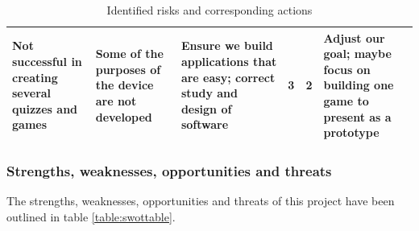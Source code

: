 \documentclass{article}
\begin{document}
\begin{table}[h]
\begin{center}
\begin{small}
\begin{tabular}{|p{3cm}|p{3cm}|p{3cm}|p{0.5cm}|p{0.5cm}|p{3cm}|}
Not successful in creating several quizzes and games                                              & Some of the purposes of the device are not developed                                                            & Ensure we build applications that are easy; correct study and design of software                                                                                                                          & 3        & 2          & Adjust our goal; maybe focus on building one game to present as a prototype                                                                       \\ \hline
\end{tabular}
\end{small}
\end{center}
\caption{Identified risks and corresponding actions}
\label{table:riskstable}
\end{table}

\subsubsection{Strengths, weaknesses, opportunities and threats}

The strengths, weaknesses, opportunities and threats of this project have been outlined in table \ref{table:swottable}.
\end{document}
